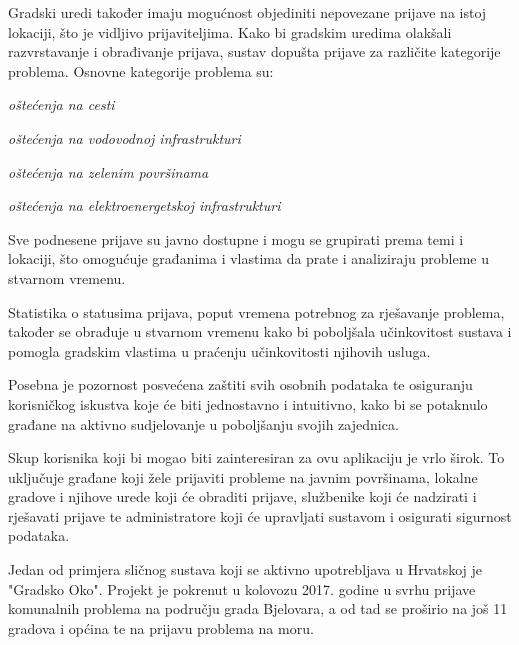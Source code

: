 \noindent Gradski uredi također imaju mogućnost objediniti nepovezane prijave na istoj lokaciji, što je vidljivo prijaviteljima.
\noindent Kako bi gradskim uredima olakšali razvrstavanje i obrađivanje prijava, sustav dopušta prijave za različite kategorije problema. Osnovne kategorije problema su:

\begin{packed_item}
	\item \textit{oštećenja na cesti}
	\item \textit{oštećenja na vodovodnoj infrastrukturi}
	\item \textit{oštećenja na zelenim površinama}
	\item \textit{oštećenja na elektroenergetskoj infrastrukturi}
\end{packed_item}

\noindent Sve podnesene prijave su javno dostupne i mogu se grupirati prema temi i lokaciji, što omogućuje građanima i vlastima da prate i analiziraju probleme u stvarnom vremenu.

\noindent Statistika o statusima prijava, poput vremena potrebnog za rješavanje problema, također se obrađuje u stvarnom vremenu kako bi poboljšala učinkovitost sustava i pomogla gradskim vlastima u praćenju učinkovitosti njihovih usluga.

\noindent Posebna je pozornost posvećena zaštiti svih osobnih podataka te osiguranju korisničkog iskustva koje će biti jednostavno i intuitivno, kako bi se potaknulo građane na aktivno sudjelovanje u poboljšanju svojih zajednica.

\noindent Skup korisnika koji bi mogao biti zainteresiran za ovu aplikaciju je vrlo širok. To uključuje građane koji žele prijaviti probleme na javnim površinama, lokalne gradove i njihove urede koji će obraditi prijave, službenike koji će nadzirati i rješavati prijave te administratore koji će upravljati sustavom i osigurati sigurnost podataka.

\noindent Jedan od primjera sličnog sustava koji se aktivno upotrebljava u Hrvatskoj je "Gradsko Oko". Projekt je pokrenut u kolovozu 2017. godine u svrhu prijave komunalnih problema na području grada Bjelovara, a od tad se proširio na još 11 gradova i općina te na prijavu problema na moru.

